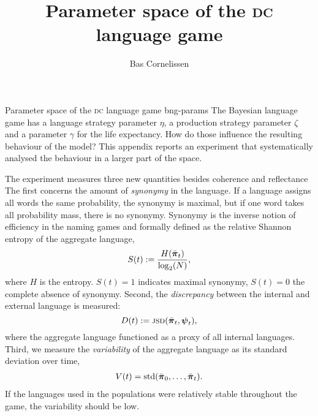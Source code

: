 \documentclass{../src/bcthesispart}
\title{Parameter space of the \textsc{dc} language game}
\author{Bas Cornelissen}
\begin{document}
%
	{Parameter space of the \textsc{dc} language game}%
	{bng-params}{%
	The Bayesian language game has a language strategy parameter $\eta$, a production strategy parameter $\zeta$ and a parameter $\gamma$ for the life expectancy.
	How do those influence the resulting behaviour of the model? 
	This appendix reports an experiment that systematically analysed the behaviour in a larger part of the space.
	}

	

The experiment measures three new quantities besides coherence and reflectance
The first concerns the amount of \emph{synonymy} in the language.
If a language assigns all words the same probability, the synonymy is maximal, but if one word takes all probability mass, there is no synonymy. 
Synonymy is the inverse notion of efficiency in the naming games and formally defined as the relative Shannon entropy of the aggregate language,
\begin{align}
	S(t) := 
		\frac{H( \bar{\vect\pi}_t )}%
		{\log_2(N)},
\end{align}
where $H$ is the entropy. $S(t) = 1$ indicates maximal synonymy, $S(t) = 0$ the complete absence of synonymy.
Second, the \emph{discrepancy} between the internal and external language is measured:
\begin{equation}
	D(t) :=
		\textsc{jsd}(\bar{\boldsymbol{\mathbf{\pi}}}_t, \boldsymbol{\mathbf{\psi}}_t),
\end{equation}
where the aggregate language functioned as a proxy of all internal languages.
Third, we measure the \emph{variability} of the aggregate language as its standard deviation over time,
\begin{align}
	V(t) = \text{std}(\bar{\boldsymbol{\mathbf{\pi}}}_0, \dots, \bar{\boldsymbol{\mathbf{\pi}}}_t).
\end{align}
If the languages used in the populations were relatively stable throughout the game, the variability should be low.
\end{document}
